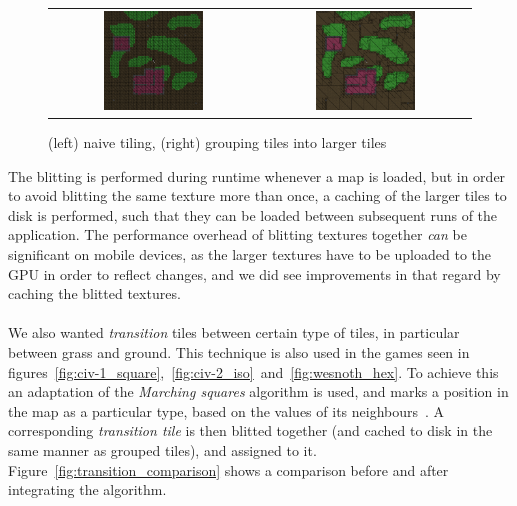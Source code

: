 \begin{figure}[H]
    \centering
    \begin{tabular}{cc}
        \includegraphics[width=0.5\textwidth]{figures/generating_levels/naive-tile.png}
        &
        \includegraphics[width=0.5\textwidth]{figures/generating_levels/grouped-tile.png}
    \end{tabular}
    \caption{(left) naive tiling, (right) grouping tiles into larger tiles}\label{fig:grouped_tiling_comparison}
\end{figure}

The blitting is performed during runtime whenever a map is loaded, but in order
to avoid blitting the same texture more than once, a caching of the larger
tiles to disk is performed, such that they can be loaded between subsequent
runs of the application.  The performance overhead of blitting textures
together \textit{can} be significant on mobile devices, as the larger textures
have to be uploaded to the GPU in order to reflect changes, and we did see
improvements in that regard by caching the blitted textures.
\\
\\
We also wanted \textit{transition} tiles between certain type of tiles, in
particular between grass and ground.  This technique is also used in the games
seen in
figures~\ref{fig:civ-1_square},~\ref{fig:civ-2_iso}~and~\ref{fig:wesnoth_hex}.
To achieve this an adaptation of the \textit{Marching squares} algorithm is
used, and marks a position in the map as a particular type, based on the values
of its neighbours~\cite{marching-squares}.  A corresponding \textit{transition
tile} is then blitted together (and cached to disk in the same manner as
grouped tiles), and assigned to it.  Figure~\ref{fig:transition_comparison}
shows a comparison before and after integrating the algorithm.

